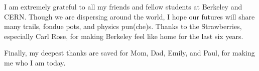 \documentclass[english]{ucbthesis}
\begin{document}
\begin{frontmatter}
\begin{acknowledgements}
I am extremely grateful to all my friends and fellow students at Berkeley and CERN. Though we are dispersing around the world, I hope our futures will share many trails, fondue pots, and physics pun(che)s. Thanks to the Strawberries, especially Carl Rose, for making Berkeley feel like home for the last six years. 

Finally, my deepest thanks are saved for Mom, Dad, Emily, and Paul, for making me who I am today. 

\end{acknowledgements}

\end{frontmatter}

\pagestyle{headings}













\end{document}
